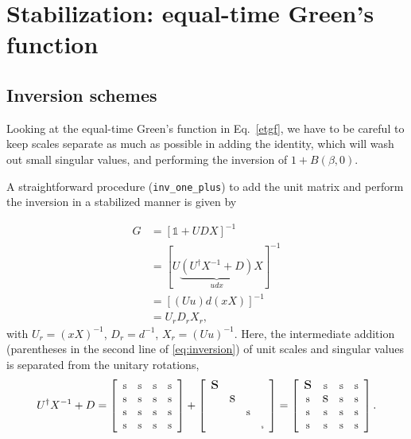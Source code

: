 \documentclass[submission, Phys]{SciPost}
\newcommand{\stiny}{\scalebox{0.5}{s}}
\newcommand{\ssmall}{\scalebox{0.9}{s}}
\newcommand{\smedium}{\scalebox{1.3}{s}}
\newcommand{\slarge}{\scalebox{1.7}{s}}
\newcommand{\U}{\left[
	\begin{array}{cccc}
		\ssmall & \ssmall & \ssmall & \ssmall \\
		\ssmall & \ssmall & \ssmall & \ssmall \\
		\ssmall & \ssmall & \ssmall & \ssmall \\
		\ssmall & \ssmall & \ssmall & \ssmall \\
	\end{array}
	\right]}
\newcommand{\D}{\left[
	\begin{array}{cccc}
		\slarge &  &  &  \\
		& \smedium &  &  \\
		&  & \ssmall &  \\
		&  &  & \stiny \\
	\end{array}
	\right]}
\begin{document}
\section{Stabilization: equal-time Green's function}

\subsection{Inversion schemes}
Looking at the equal-time Green's function in Eq.~\ref{etgf}, we have to be careful to keep scales separate as much as possible in adding the identity, which will wash out small singular values, and performing the inversion of $1 + B(\beta, 0)$.

A straightforward procedure (\texttt{inv\_one\_plus}) to add the unit matrix and perform the inversion in a stabilized manner is given by \cite{Santos2003, Assaad2002a}

\begin{align}
	G &= [\mathbb{1} + UDX]^{-1} \nonumber \\
	&= [U\underbrace{(U^\dagger X^{-1} + D)}_{udx}X]^{-1} \nonumber\\
	&= [(Uu)d(xX)]^{-1} \label{eq:inversion}\\
	&= U_r D_r X_r \nonumber,
\end{align}
with $U_r = (xX)^{-1}$, $D_r = d^{-1}$, $X_r = (Uu)^{-1}$. Here, the intermediate addition (parentheses in the second line of \eqref{eq:inversion}) of unit scales and singular values is separated from the unitary rotations,
\begin{align}
U^\dagger X^{-1} + D = \U + \D = \left[
\begin{array}{cccc}
\slarge & \ssmall & \ssmall & \ssmall \\
\ssmall & \smedium & \ssmall & \ssmall \\
\ssmall & \ssmall & \ssmall & \ssmall \\
\ssmall & \ssmall & \ssmall & \ssmall \\
\end{array}
\right].
\end{align}
\end{document}

